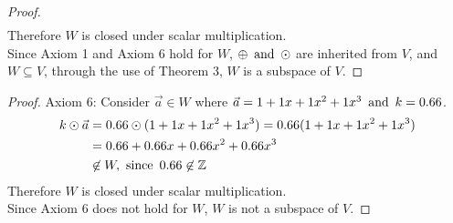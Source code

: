 \begin{enumerate}
\begin{proof}
\begin{align*}
    \end{align*}
    Therefore $W$ is closed under scalar multiplication. \\
    Since Axiom 1 and Axiom 6 hold for $W$, $\oplus \operatorname{~\text{and}~} \odot$ are inherited from $V$, and $W \subseteq V$, through the use of Theorem 3, $W$ is a subspace of $V$.
  \end{proof}
  \begin{proof}
    Axiom 6: Consider $\vec{a} \in W$ where $\vec{a} = 1+1x+1x^2+1x^3 \operatorname{~\text{and}~} k = 0.66$.
    \begin{align*}
      k \odot \vec{a} & = 0.66 \odot (1+1x+1x^2+1x^3) = 0.66(1+1x+1x^2+1x^3) \\
                      & = 0.66+0.66x+0.66x^2+0.66x^3                         \\
                      & \not \in W, \operatorname{~\text{since}~} 0.66 \not \in \mathbb{Z}
    \end{align*}
    Therefore $W$ is  closed under scalar multiplication. \\
    Since Axiom 6 does not hold for $W$, $W$ is not a subspace of $V$.
  \end{proof}
\end{enumerate}

